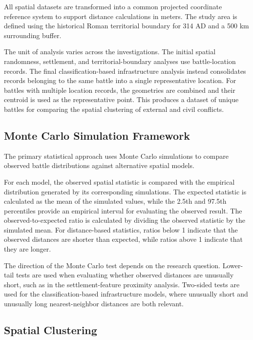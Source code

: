 \documentclass[
  letterpaper,
  DIV=11,
  numbers=noendperiod]{scrartcl}
\begin{document}
All spatial datasets are transformed into a common projected coordinate
reference system to support distance calculations in meters. The study
area is defined using the historical Roman territorial boundary for 314
AD and a 500 km surrounding buffer.

The unit of analysis varies across the investigations. The initial
spatial randomness, settlement, and territorial-boundary analyses use
battle-location records. The final classification-based infrastructure
analysis instead consolidates records belonging to the same battle into
a single representative location. For battles with multiple location
records, the geometries are combined and their centroid is used as the
representative point. This produces a dataset of unique battles for
comparing the spatial clustering of external and civil conflicts.

\subsection{Monte Carlo Simulation
Framework}\label{monte-carlo-simulation-framework}

The primary statistical approach uses Monte Carlo simulations to compare
observed battle distributions against alternative spatial models.

For each model, the observed spatial statistic is compared with the
empirical distribution generated by its corresponding simulations. The
expected statistic is calculated as the mean of the simulated values,
while the 2.5th and 97.5th percentiles provide an empirical interval for
evaluating the observed result. The observed-to-expected ratio is
calculated by dividing the observed statistic by the simulated mean. For
distance-based statistics, ratios below 1 indicate that the observed
distances are shorter than expected, while ratios above 1 indicate that
they are longer.

The direction of the Monte Carlo test depends on the research question.
Lower-tail tests are used when evaluating whether observed distances are
unusually short, such as in the settlement-feature proximity analysis.
Two-sided tests are used for the classification-based infrastructure
models, where unusually short and unusually long nearest-neighbor
distances are both relevant.

\subsection{Spatial Clustering}\label{spatial-clustering}
\end{document}
